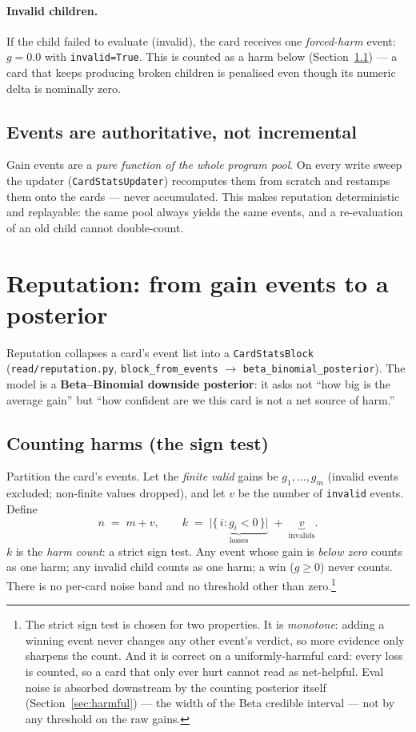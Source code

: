 \documentclass[11pt]{article}
\newcommand{\code}[1]{\texttt{\small #1}}
\newcommand{\gain}{g}
\begin{document}
\paragraph{Invalid children.} If the child failed to evaluate (invalid), the card
receives one \emph{forced-harm} event: $\gain=0.0$ with \code{invalid=True}. This
is counted as a harm below (Section~\ref{sec:harm}) --- a card that keeps
producing broken children is penalised even though its numeric delta is nominally
zero.

\subsection{Events are authoritative, not incremental}

Gain events are a \emph{pure function of the whole program pool}. On every write
sweep the updater (\code{CardStatsUpdater}) recomputes them from scratch and
restamps them onto the cards --- never accumulated. This makes reputation
deterministic and replayable: the same pool always yields the same events, and a
re-evaluation of an old child cannot double-count.

\section{Reputation: from gain events to a posterior}
\label{sec:rep}

Reputation collapses a card's event list into a \code{CardStatsBlock}
(\code{read/reputation.py}, \code{block\_from\_events} $\to$
\code{beta\_binomial\_posterior}). The model is a \textbf{Beta--Binomial downside
posterior}: it asks not ``how big is the average gain'' but ``how confident are we
this card is not a net source of harm.''

\subsection{Counting harms (the sign test)}
\label{sec:harm}

Partition the card's events. Let the \emph{finite valid} gains be
$\gain_1,\dots,\gain_m$ (invalid events excluded; non-finite values dropped), and
let $v$ be the number of \code{invalid} events. Define
\[
  n \;=\; m + v,
  \qquad
  k \;=\; \underbrace{\bigl|\{\, i : \gain_i < 0 \,\}\bigr|}_{\text{losses}}
          \;+\; \underbrace{v}_{\text{invalids}} .
\]
$k$ is the \emph{harm count}: a strict sign test. Any event whose gain is
\emph{below zero} counts as one harm; any invalid child counts as one harm; a win
($\gain \ge 0$) never counts. There is no per-card noise band and no threshold
other than zero.\footnote{The strict sign test is chosen for two properties. It is
\emph{monotone}: adding a winning event never changes any other event's verdict, so
more evidence only sharpens the count. And it is correct on a uniformly-harmful
card: every loss is counted, so a card that only ever hurt cannot read as
net-helpful. Eval noise is absorbed downstream by the counting posterior itself
(Section~\ref{sec:harmful}) --- the width of the Beta credible interval --- not by
any threshold on the raw gains.}
\end{document}
